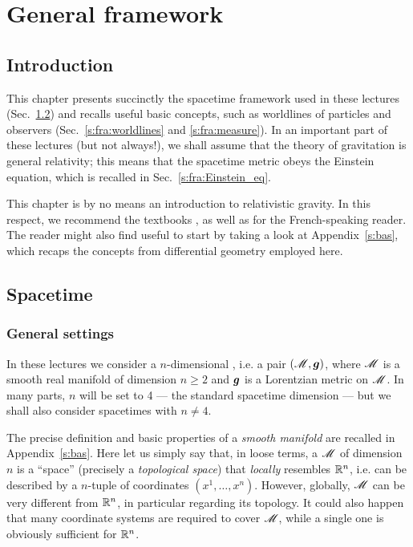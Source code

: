 \chapter{General framework} \label{s:fra}

\minitoc

\section{Introduction}

This chapter presents succinctly the spacetime framework used in these lectures
(Sec.~\ref{s:fra:spacetime})
and recalls useful basic concepts, such as worldlines of particles and observers
(Sec.~\ref{s:fra:worldlines} and \ref{s:fra:measure}).
In an important part of these lectures (but not always!),
we shall assume that the theory of gravitation is general
relativity; this means that the spacetime metric obeys the Einstein equation,
which is recalled in Sec.~\ref{s:fra:Einstein_eq}.

This chapter is by no means an introduction to relativistic gravity. In this respect, we
recommend the textbooks \cite{Carro04,Choqu15,DerueU18,Hartl03,MisneTW73,Strau13,Wald84}, as well as \cite{DerueU14,Gourg14,Langl13} for the French-speaking reader.
The reader might also find useful to start by taking a look at Appendix~\ref{s:bas}, which
recaps the concepts from differential geometry employed here.

\section{Spacetime} \label{s:fra:spacetime}

\subsection{General settings}

In these lectures we consider a $n$-dimensional ,
i.e. a pair $(\mathscr{M}, \bm{g})$, where $\mathscr{M}$ is a smooth real manifold of dimension $n\geq 2$
and $\bm{g}$ is a Lorentzian metric on $\mathscr{M}$. In many parts, $n$ will be set to 4
--- the standard spacetime dimension --- but we shall also consider spacetimes with
$n\neq 4$.

The precise definition and basic properties of a \emph{smooth manifold} are recalled
in Appendix~\ref{s:bas}. Here let us simply say that, in loose terms,
a  $\mathscr{M}$ of dimension $n$ is a ``space'' (precisely a
\emph{topological space}) that \emph{locally} resembles $\mathbb{R}^n$,
i.e. can be described by a $n$-tuple of coordinates $(x^1,\ldots,x^n)$. However, globally,
$\mathscr{M}$ can be very different from $\mathbb{R}^n$, in particular regarding its topology. It could also happen
that many coordinate systems are required to cover $\mathscr{M}$, while a single one is obviously
sufficient for $\mathbb{R}^n$.

